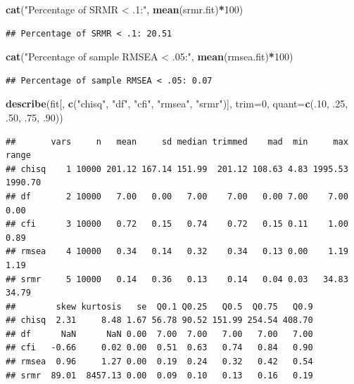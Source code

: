 \documentclass[]{article}
\newenvironment{Shaded}{\begin{snugshade}}{\end{snugshade}}
\newcommand{\KeywordTok}[1]{\textcolor[rgb]{0.13,0.29,0.53}{\textbf{#1}}}
\newcommand{\DataTypeTok}[1]{\textcolor[rgb]{0.13,0.29,0.53}{#1}}
\newcommand{\DecValTok}[1]{\textcolor[rgb]{0.00,0.00,0.81}{#1}}
\newcommand{\StringTok}[1]{\textcolor[rgb]{0.31,0.60,0.02}{#1}}
\newcommand{\OperatorTok}[1]{\textcolor[rgb]{0.81,0.36,0.00}{\textbf{#1}}}
\newcommand{\NormalTok}[1]{#1}
\begin{document}
\begin{Shaded}
\begin{Highlighting}[]
\KeywordTok{cat}\NormalTok{(}\StringTok{"Percentage of SRMR < .1:"}\NormalTok{, }\KeywordTok{mean}\NormalTok{(srmr.fit)}\OperatorTok{*}\DecValTok{100}\NormalTok{)}
\end{Highlighting}
\end{Shaded}

\begin{verbatim}
## Percentage of SRMR < .1: 20.51
\end{verbatim}

\begin{Shaded}
\begin{Highlighting}[]
\KeywordTok{cat}\NormalTok{(}\StringTok{"Percentage of sample RMSEA < .05:"}\NormalTok{, }\KeywordTok{mean}\NormalTok{(rmsea.fit)}\OperatorTok{*}\DecValTok{100}\NormalTok{)}
\end{Highlighting}
\end{Shaded}

\begin{verbatim}
## Percentage of sample RMSEA < .05: 0.07
\end{verbatim}

\begin{Shaded}
\begin{Highlighting}[]
\KeywordTok{describe}\NormalTok{(fit[, }\KeywordTok{c}\NormalTok{(}\StringTok{"chisq"}\NormalTok{, }\StringTok{"df"}\NormalTok{, }\StringTok{"cfi"}\NormalTok{, }\StringTok{"rmsea"}\NormalTok{, }\StringTok{"srmr"}\NormalTok{)], }
         \DataTypeTok{trim=}\DecValTok{0}\NormalTok{, }\DataTypeTok{quant=}\KeywordTok{c}\NormalTok{(.}\DecValTok{10}\NormalTok{, .}\DecValTok{25}\NormalTok{, .}\DecValTok{50}\NormalTok{, .}\DecValTok{75}\NormalTok{, .}\DecValTok{90}\NormalTok{))}
\end{Highlighting}
\end{Shaded}

\begin{verbatim}
##       vars     n   mean     sd median trimmed    mad  min     max   range
## chisq    1 10000 201.12 167.14 151.99  201.12 108.63 4.83 1995.53 1990.70
## df       2 10000   7.00   0.00   7.00    7.00   0.00 7.00    7.00    0.00
## cfi      3 10000   0.72   0.15   0.74    0.72   0.15 0.11    1.00    0.89
## rmsea    4 10000   0.34   0.14   0.32    0.34   0.13 0.00    1.19    1.19
## srmr     5 10000   0.14   0.36   0.13    0.14   0.04 0.03   34.83   34.79
##        skew kurtosis   se  Q0.1 Q0.25   Q0.5  Q0.75   Q0.9
## chisq  2.31     8.48 1.67 56.78 90.52 151.99 254.54 408.70
## df      NaN      NaN 0.00  7.00  7.00   7.00   7.00   7.00
## cfi   -0.66     0.02 0.00  0.51  0.63   0.74   0.84   0.90
## rmsea  0.96     1.27 0.00  0.19  0.24   0.32   0.42   0.54
## srmr  89.01  8457.13 0.00  0.09  0.10   0.13   0.16   0.19
\end{verbatim}
\end{document}
